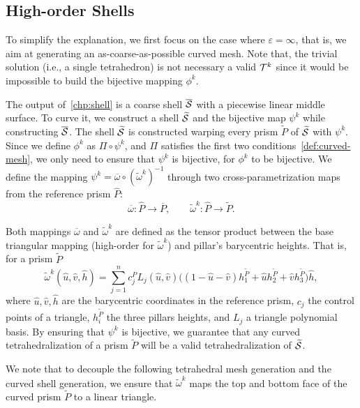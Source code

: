 \subsection{High-order Shells}\label{cumin:sec:high-order}
To simplify the explanation, we first focus on the case where $\varepsilon = \infty$, that is, we aim at generating {an} as-coarse-as-possible curved mesh. Note that, the trivial solution (i.e., a single tetrahedron) is not necessary a valid $\mathcal{T}^k$ since it would be impossible to build the bijective mapping $\phi^k$.

The output of~\ref{chp:shell} is a coarse shell $\overline{\mathcal{S}}$ with {a} piecewise linear middle surface. To curve it, we construct a shell $\widetilde{\mathcal{S}}$ and the bijective map $\psi^k$ while constructing $\overline{\mathcal{S}}$. 
The shell $\widetilde{\mathcal{S}}$ is constructed warping every prism $\widetilde P$ of $\widetilde{\mathcal{S}}$ with $\psi^k$. Since we define $\phi^k$ as  $\Pi \circ \psi^k$, and $\Pi$ satisfies the first two conditions~\ref{def:curved-mesh}, we only need to ensure that $\psi^k$ is bijective, for $\phi^k$ to be bijective.  We define the mapping $\psi^k = \overline\omega\circ(\widetilde\omega^k)^{-1}$ {through} two {cross-parametrization} maps from the reference prism $\hat P$: 
\[
\overline\omega \colon \hat P \to \overline P, \qquad
\widetilde\omega^k \colon \hat P \to \widetilde P.
\]

Both mappings $\overline\omega$ and $\widetilde\omega^k$ are defined as the tensor product between the base triangular mapping (high-order for $\widetilde\omega^k$) and pillar's {barycentric} heights. That is, for a prism $\widetilde P$
\[
\widetilde\omega^k (\hat u,\hat v, \hat h) = 
\sum_{j=1}^n c_j^P L_j(\hat u,\hat v) \big((1-\hat u - \hat v)  h_1^{\widetilde P}+ \hat u h_2^{\widetilde P} + \hat v  h_3^{\widetilde P}\big)\hat h,
\]
where $\hat u,\hat v,\hat h$ are the barycentric coordinates in the reference prism, $c_j$ the control points of a triangle, $h_i^{\widetilde P}$ the three pillars heights, and $L_j$ a triangle polynomial basis.
By ensuring that $\psi^k$ is bijective, we guarantee that any curved tetrahedralization of a prism $\widetilde P$ will be a valid tetrahedralization of $\widetilde{\mathcal{S}}$.

We note that to decouple the following tetrahedral mesh generation and the curved shell generation, we ensure that $\widetilde\omega^k$ maps the top and bottom face of the curved prism $\widetilde P$ to a linear triangle.

